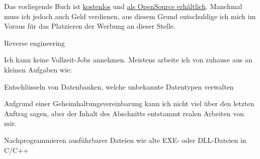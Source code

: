 \vspace*{\fill}

\iffalse
\huge
	Bitte nehmen Sie an der kurzen Umfrage teil, unter
\normalsize

\bigskip
\bigskip
\bigskip

\dots \url{https://beginners.re/survey.html}.
Dies kann sehr hilfreich für den Autor sein!

\bigskip
\bigskip
\bigskip
\fi

\huge
\normalsize

\bigskip
\bigskip
\bigskip

Das vorliegende Buch ist \href{http://beginners.re/}{kostenlos} und
\href{https://github.com/DennisYurichev/RE-for-beginners/}{als OpenSource erhältlich}.
Manchmal muss ich jedoch auch Geld verdienen, aus diesem Grund entschuldige ich mich im Voraus
für das Platzieren der Werbung an dieser Stelle.

\iffalse
\Large Benötigen Sie Dokumentationen? \normalsize

Ich kann versuchen Dokumentationen, Referenzen und Handbücher für einige APIs,
Sprachen, Frameworks und so weiter zu schreiben.

Manchmal bin ich gut im Finden von präzisen und klaren Beispielen für jedes API- oder Sprachfeature.
Dieses Buch ist ein Beispiel dafür.
Ich kann versuchen dies in einer ausführlichen und zuverlässigen Art zu tun.

Auf der anderen Seite ist mein Englisch weit entfernt davon fließend zu sein und
ich könnte lange brauchen um mich tief in Produkte einzuarbeiten die ich nicht kenne.

Ich wäre aber erfreut existierende Dokumentationsprojekte zu überarbeiten.
Eine Beispielreferenz die ich bewundere ist Wolfram Mathematica: \url{http://reference.wolfram.com/language/}.
\fi

\Large Reverse engineering \normalsize

Ich kann keine Vollzeit-Jobs annehmen. Meistens arbeite ich von zuhause aus an kleinen Aufgaben wie:

\large Entschlüsseln von Datenbanken, welche unbekannte Datentypen verwalten \normalsize

Aufgrund einer Geheimhaltungsvereinbarung kann ich nicht viel über den letzten Auftrag
sagen, aber der Inhalt des Abschnitts  entstammt realen Arbeiten von mir.

\large Nachprogrammieren ausführbarer Dateien wie alte EXE- oder DLL-Dateien in C/C++ \normalsize

